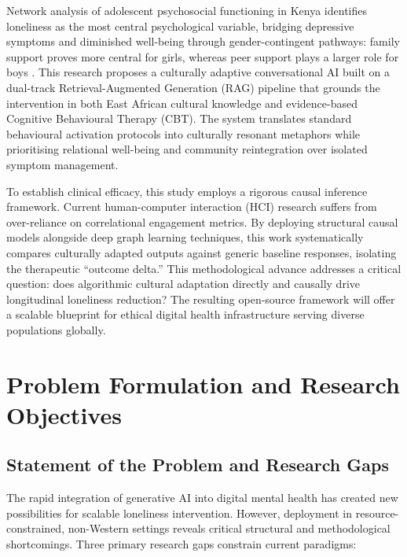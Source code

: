 \documentclass[12pt,a4paper]{article}
\begin{document}
Network analysis of adolescent psychosocial functioning in Kenya identifies loneliness as the most central psychological variable, bridging depressive symptoms and diminished well-being through gender-contingent pathways: family support proves more central for girls, whereas peer support plays a larger role for boys \citep{Ndetei2025}. This research proposes a culturally adaptive conversational AI built on a dual-track Retrieval-Augmented Generation (RAG) pipeline that grounds the intervention in both East African cultural knowledge and evidence-based Cognitive Behavioural Therapy (CBT). The system translates standard behavioural activation protocols into culturally resonant metaphors while prioritising relational well-being and community reintegration over isolated symptom management.

To establish clinical efficacy, this study employs a rigorous causal inference framework. Current human-computer interaction (HCI) research suffers from over-reliance on correlational engagement metrics. By deploying structural causal models alongside deep graph learning techniques, this work systematically compares culturally adapted outputs against generic baseline responses, isolating the therapeutic ``outcome delta.'' This methodological advance addresses a critical question: does algorithmic cultural adaptation directly and causally drive longitudinal loneliness reduction? The resulting open-source framework will offer a scalable blueprint for ethical digital health infrastructure serving diverse populations globally.

\section{Problem Formulation and Research Objectives}

\subsection{Statement of the Problem and Research Gaps}

The rapid integration of generative AI into digital mental health has created new possibilities for scalable loneliness intervention. However, deployment in resource-constrained, non-Western settings reveals critical structural and methodological shortcomings. Three primary research gaps constrain current paradigms:
\end{document}

